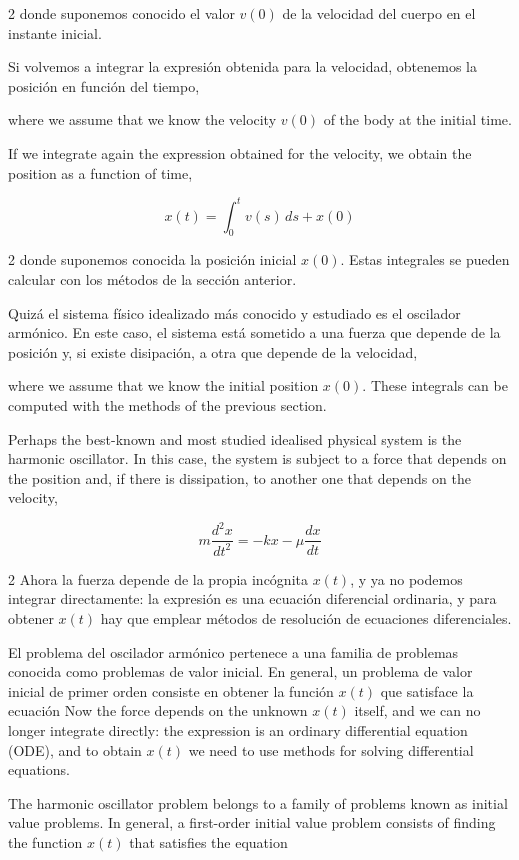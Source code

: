 \begin{paracol}{2}
donde suponemos conocido el valor $v(0)$ de la velocidad del cuerpo en el instante inicial.

Si volvemos a integrar la expresión obtenida para la velocidad, obtenemos la posición en función del tiempo,

\switchcolumn
where we assume that we know the velocity $v(0)$ of the body at the initial time.

If we integrate again the expression obtained for the velocity, we obtain the position as a function of time,
\end{paracol}
\begin{equation*}
x(t)=\int_0^t v(s)\,ds+x(0)
\end{equation*}
\begin{paracol}{2}
donde suponemos conocida la posición inicial $x(0)$. Estas integrales se pueden calcular con los métodos de la sección anterior.

Quizá el sistema físico idealizado más conocido y estudiado es el oscilador armónico. En este caso, el sistema está sometido a una fuerza que depende de la posición y, si existe disipación, a otra que depende de la velocidad,

\switchcolumn
where we assume that we know the initial position $x(0)$. These integrals can be computed with the methods of the previous section.

Perhaps the best-known and most studied idealised physical system is the harmonic oscillator. In this case, the system is subject to a force that depends on the position and, if there is dissipation, to another one that depends on the velocity,
\end{paracol}
\begin{equation*}
m\frac{d^2x}{dt^2}=-kx-\mu \frac{dx}{dt}
\end{equation*}
\begin{paracol}{2}
Ahora la fuerza depende de la propia incógnita $x(t)$, y ya no podemos integrar directamente: la expresión es una ecuación diferencial ordinaria, y para obtener $x(t)$ hay que emplear métodos de resolución de ecuaciones diferenciales.

El problema del oscilador armónico pertenece a una familia de problemas conocida como problemas de valor inicial. En general, un problema de valor inicial de primer orden consiste en obtener la función $x(t)$ que satisface la ecuación
\switchcolumn
Now the force depends on the unknown $x(t)$ itself, and we can no longer integrate directly: the expression is an ordinary differential equation (ODE), and to obtain $x(t)$ we need to use methods for solving differential equations.

The harmonic oscillator problem belongs to a family of problems known as initial value problems. In general, a first-order initial value problem consists of finding the function $x(t)$ that satisfies the equation
\end{paracol}
